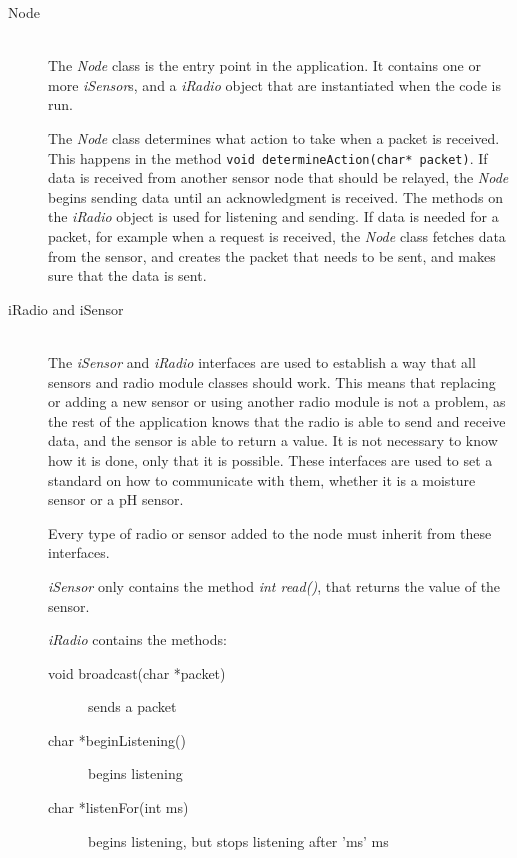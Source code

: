 \begin{description}
\item[Node] \hfill \\
The \textit{Node} class is the entry point in the application.
It contains one or more \textit{iSensor}s, and a \textit{iRadio} object that are instantiated when the code is run.

The \textit{Node} class determines what action to take when a packet is received. This happens in the method \texttt{void determineAction(char* packet)}.
If data is received from another sensor node that should be relayed, the \textit{Node} begins sending data until an acknowledgment is received. The methods on the \textit{iRadio} object is used for listening and sending.
If data is needed for a packet, for example when a request is received, the \textit{Node} class fetches data from the sensor, and creates the packet that needs to be sent, and makes sure that the data is sent.

\item[iRadio and iSensor] \hfill \\
The \textit{iSensor} and \textit{iRadio} interfaces are used to establish a way that all sensors and radio module classes should work. This means that replacing or adding a new sensor or using another radio module is not a problem, as the rest of the application knows that the radio is able to send and receive data, and the sensor is able to return a value. 
It is not necessary to know how it is done, only that it is possible. These interfaces are used to set a standard on how to communicate with them, whether it is a moisture sensor or a pH sensor.

Every type of radio or sensor added to the node must inherit from these interfaces.


\textit{iSensor} only contains the method \textit{int read()}, that returns the value of the sensor.

\textit{iRadio} contains the methods:
\begin{description}
\item[void broadcast(char *packet)] sends a packet
\item[char *beginListening()] begins listening
\item[char *listenFor(int ms)] begins listening, but stops listening after 'ms' ms
\end{description}


\end{description}
